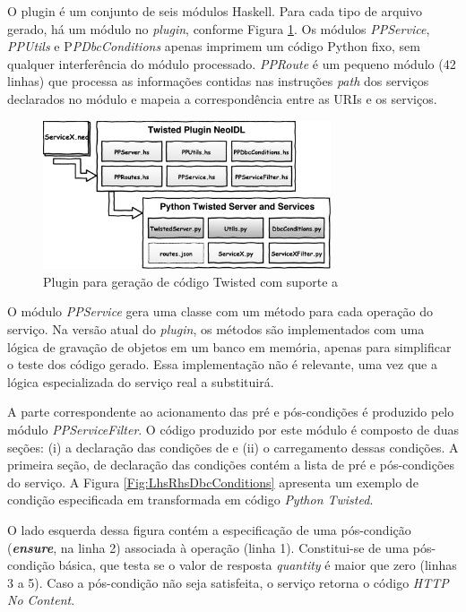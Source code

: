 O plugin \twisted{} é um conjunto de seis módulos Haskell. Para cada tipo de
arquivo gerado, há um módulo no \textit{plugin}, conforme Figura
\ref{PluginTwisted}.
Os módulos \emph{PPService}, \emph{PPUtils} e P\emph{PDbcConditions} apenas
imprimem um código Python fixo, sem qualquer interferência do módulo \neoidl{}
processado. \emph{PPRoute} é um pequeno módulo (42 linhas) que processa as
informações contidas nas instruções \emph{path} dos serviços declarados no
módulo \neoidl{} e mapeia a correspondência entre as URIs e os serviços.

\begin{figure}[!htb]
\centering
\includegraphics[width=85mm,trim = 0mm 0mm 0mm 
0mm,clip]{img/PluginTwisted.pdf}
\caption{Plugin para geração de código Twisted com suporte a \designbycontract{}}
\label{PluginTwisted}
\end{figure}

O módulo \emph{PPService} gera uma classe com um método para cada operação do
serviço. Na versão atual do \textit{plugin}, os métodos são implementados com
uma lógica de gravação de objetos em um banco em memória, apenas para simplificar o teste
dos código gerado. Essa implementação não é relevante, uma vez que a lógica
especializada do serviço real a substituirá.

A parte correspondente ao acionamento das pré e pós-condições é produzido pelo
módulo \emph{PPServiceFilter}. O código produzido por este módulo é composto de
duas seções: (i) a declaração das condições de \designbycontract{} e (ii) o
carregamento dessas condições. A primeira seção, de declaração das condições
\designbycontract{} contém a lista de pré e pós-condições do serviço. A Figura 
\ref{Fig:LhsRhsDbcConditions} apresenta um exemplo de condição especificada em
\neoidl{} transformada em código \emph{Python Twisted}.

O lado esquerda dessa
figura contém a especificação de uma pós-condição (\emph{\textbf{ensure}}, na
linha 2) associada à operação  (linha 1). Constitui-se de uma
pós-condição básica, que testa se o valor de resposta \emph{quantity} é maior que zero
(linhas 3 a 5). Caso a pós-condição não seja satisfeita, o serviço retorna o
código \emph{HTTP No Content}.



